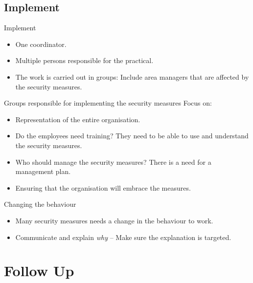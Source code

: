 \documentclass{beamer}
\begin{document}
\subsection{Implement}
\begin{frame}{Implement}
  \begin{itemize}
    \item One coordinator.
    \item Multiple persons responsible for the practical.
    \item The work is carried out in groups: Include area managers that are
      affected by the security measures.
  \end{itemize}
\end{frame}
\begin{frame}{Groups responsible for implementing the security measures}
  Focus on:
  \begin{itemize}
    \item Representation of the entire organisation.
    \item Do the employees need training?
      They need to be able to use and understand the security measures.
    \item Who should manage the security measures?
      There is a need for a management plan.
    \item Ensuring that the organisation will embrace the measures.
  \end{itemize}
\end{frame}
\begin{frame}{Changing the behaviour}
  \begin{itemize}
    \item Many security measures needs a change in the behaviour to work.
    \item Communicate and explain \emph{why} -- Make sure the explanation is
      targeted.
  \end{itemize}
\end{frame}


\section{Follow Up}
\end{document}
